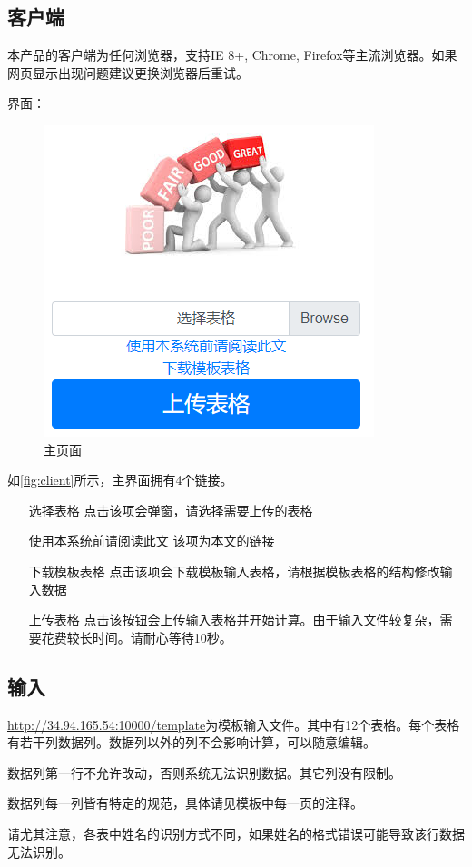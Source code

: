 \documentclass[UTF8,fontset=windowsnew]{ctexart}
\begin{document}
\subsection{客户端}
本产品的客户端为任何浏览器，支持IE 8+, Chrome, Firefox等主流浏览器。如果网页显示出现问题建议更换浏览器后重试。\par
界面：\par
\begin{figure}[h]
  \centering
  \includegraphics[width=.5\textwidth]{image/client.png}
  \caption{主页面}
  \label{fig:client}
\end{figure}
如\autoref{fig:client}所示，主界面拥有4个链接。\par
\begin{itemize}[font=\emph,leftmargin=1cm]
  \item [选择表格] 点击该项会弹窗，请选择需要上传的表格
  \item [使用本系统前请阅读此文] 该项为本文的链接
  \item [下载模板表格] 点击该项会下载模板输入表格，请根据模板表格的结构修改输入数据
  \item [上传表格] 点击该按钮会上传输入表格并开始计算。由于输入文件较复杂，需要花费较长时间。请耐心等待10秒。
\end{itemize}
\subsection{输入}
\url{http://34.94.165.54:10000/template}为模板输入文件。其中有12个表格。每个表格有若干列数据列。数据列以外的列不会影响计算，可以随意编辑。\par
数据列第一行不允许改动，否则系统无法识别数据。其它列没有限制。\par
数据列每一列皆有特定的规范，具体请见模板中每一页的注释。\par
请尤其注意，各表中姓名的识别方式不同，如果姓名的格式错误可能导致该行数据无法识别。
\end{document}
